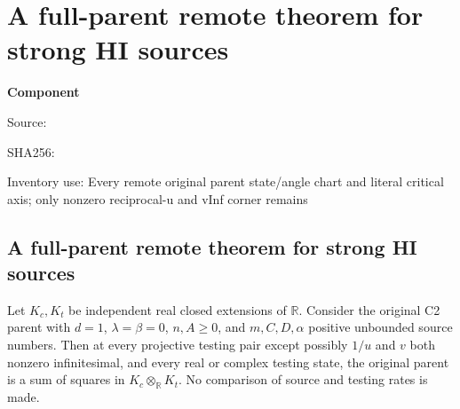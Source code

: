 \chapter{A full-parent remote theorem for strong HI sources}
\label{component:pcee1372511ed}
\noindent\textbf{Component }\par
{\small\noindent Source: \par}
{\small\noindent SHA256: \par}
{\small\noindent Inventory use: Every remote original parent state/angle chart and literal critical axis; only nonzero reciprocal-u and vInf corner remains\par}
\medskip
\section{A full-parent remote theorem for strong HI sources}
\label{pcee1372511ed:sec:hi-remote}
\begin{theorem}
Let $K_c,K_t$ be independent real closed extensions of $\mathbb R$.
Consider the original C2 parent with $d=1$, $\lambda=\beta=0$,
$n,A\geq0$, and $m,C,D,\alpha$ positive unbounded source numbers.
Then at every projective testing pair except possibly
$1/u$ and $v$ both nonzero infinitesimal, and every real or complex testing
state, the
original parent is a sum of squares in $K_c\otimes_{\mathbb R}K_t$.
No comparison of source and testing rates is made.
\end{theorem}

